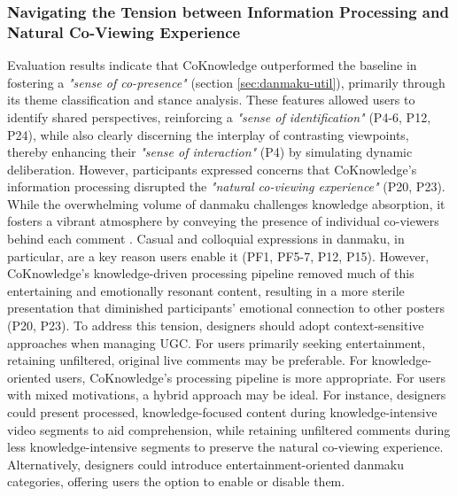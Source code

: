\subsubsection{Navigating the Tension between Information Processing and Natural Co-Viewing Experience}
Evaluation results indicate that CoKnowledge outperformed the baseline in fostering a \textit{"sense of co-presence"} (section \ref{sec:danmaku-util}), primarily through its theme classification and stance analysis. These features allowed users to identify shared perspectives, reinforcing a \textit{"sense of identification"} (P4-6, P12, P24), while also clearly discerning the interplay of contrasting viewpoints, thereby enhancing their \textit{"sense of interaction"} (P4) by simulating dynamic deliberation. However, participants expressed concerns that CoKnowledge's information processing disrupted the \textit{"natural co-viewing experience"} (P20, P23). While the overwhelming volume of danmaku challenges knowledge absorption, it fosters a vibrant atmosphere by conveying the presence of individual co-viewers behind each comment \cite{chen2017watching, liu2016watching}. Casual and colloquial expressions in danmaku, in particular, are a key reason users enable it (PF1, PF5-7, P12, P15). However, CoKnowledge’s knowledge-driven processing pipeline removed much of this entertaining and emotionally resonant content, resulting in a more sterile presentation that diminished participants’ emotional connection to other posters (P20, P23). 
To address this tension, designers should adopt context-sensitive approaches when managing UGC. For users primarily seeking entertainment, retaining unfiltered, original live comments may be preferable. For knowledge-oriented users, CoKnowledge’s processing pipeline is more appropriate. For users with mixed motivations, a hybrid approach may be ideal. For instance, designers could present processed, knowledge-focused content during knowledge-intensive video segments to aid comprehension, while retaining unfiltered comments during less knowledge-intensive segments to preserve the natural co-viewing experience. Alternatively, designers could introduce entertainment-oriented danmaku categories, offering users the option to enable or disable them.

